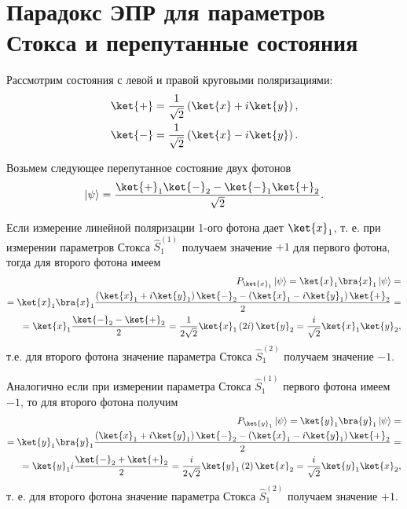 \section{Парадокс ЭПР для параметров
  Стокса и перепутанные состояния}

Рассмотрим состояния с левой и правой круговыми поляризациями:
\begin{eqnarray}
  \ket{ + } = \frac{1}{\sqrt{2}}
  \left(
  \ket{x} + i \ket{y}
  \right),
  \nonumber \\
  \ket{ - } = \frac{1}{\sqrt{2}}
  \left(
  \ket{x} - i \ket{y}
  \right).
  \nonumber
\end{eqnarray}

Возьмем следующее перепутанное состояние двух фотонов
\begin{eqnarray}
  \left|\psi\right> = \frac{
    \ket{ + }_1\ket{ - }_2 -
    \ket{ - }_1\ket{ + }_2
  }{\sqrt{2}}.
  \nonumber
\end{eqnarray}

Если измерение линейной поляризации 1-ого фотона дает
$\ket{x}_1$, т. е. при измерении параметров Стокса
$\hat{S}_1^{(1)}$ получаем значение $+1$ для первого фотона, тогда для
второго фотона имеем
\begin{eqnarray}
  P_{\ket{x}_1}\left|\psi\right> =
  \ket{x}_1\bra{x}_1 \left|\psi\right> =
  \nonumber \\
  =
  \ket{x}_1\bra{x}_1
  \frac{
    \left( \ket{x}_1 + i \ket{y}_1 \right)\ket{ - }_2 -
    \left( \ket{x}_1 - i \ket{y}_1 \right)\ket{ + }_2
  }{2} =
  \nonumber \\
  =
  \ket{x}_1
  \frac{\ket{ - }_2 - \ket{ + }_2}{2} =
  \frac{1}{2\sqrt{2}}\ket{x}_1 \left(2 i\right)
  \ket{y}_2 =
  \frac{i}{\sqrt{2}}\ket{x}_1\ket{y}_2,
  \nonumber
\end{eqnarray}
т.е. для второго фотона значение параметра Стокса 
$\hat{S}_1^{(2)}$ получаем значение $-1$.

Аналогично если при измерении параметра Стокса $\hat{S}_1^{(1)}$
первого фотона имеем $-1$, то для второго фотона получим
\begin{eqnarray}
  P_{\ket{y}_1}\left|\psi\right> =
  \ket{y}_1\bra{y}_1 \left|\psi\right> =
  \nonumber \\
  =
  \ket{y}_1\bra{y}_1
  \frac{
    \left( \ket{x}_1 + i \ket{y}_1 \right)\ket{ - }_2 -
    \left( \ket{x}_1 - i \ket{y}_1 \right)\ket{ + }_2
  }{2} =
  \nonumber \\
  =
  \ket{y}_1 i 
  \frac{\ket{ - }_2 + \ket{ + }_2}{2} =
  \frac{i}{2\sqrt{2}}\ket{y}_1 \left(2\right)
  \ket{x}_2 =
  \frac{i}{\sqrt{2}}\ket{y}_1\ket{x}_2,
  \nonumber
\end{eqnarray}
т. е. для второго фотона значение параметра Стокса 
$\hat{S}_1^{(2)}$ получаем значение $+1$.

